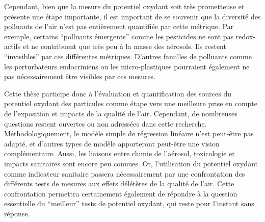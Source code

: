 Cependant, bien que la mesure du potentiel oxydant soit très prometteuse et présente une
étape importante, il est important de se souvenir que la diversité des polluants de l'air
n'est pas entièrement quantifiée par cette métrique.  Par exemple, certains ``polluants
émergents'' comme les pesticides ne sont pas redox-actifs et ne contribuent que très peu à
la masse des aérosols. Ils restent ``invisibles'' par ces différentes métriques. D'autres
familles de polluants comme les perturbateurs endocriniens ou les micro-plastiques pourraient
également ne pas nécessairement être visibles par ces mesures.

Cette thèse participe donc à l'évaluation et quantification des sources
du potentiel oxydant des particules comme étape vers une meilleure prise en compte de
l'exposition et impacts de la qualité de l'air. Cependant, de nombreuses questions restent
ouvertes ou non adressées dans cette recherche. Méthodologiquement, le modèle simple de
régression linéaire n'est peut-être pas adapté, et d'autres types de modèle apporteront
peut-être une vision complémentaire. Aussi, les liaisons entre chimie de l'aérosol,
toxicologie et impacts sanitaires sont encore peu connues. Or, l'utilisation du potentiel
oxydant comme indicateur sanitaire passera nécessairement par une confrontation des
différents tests de mesures aux effets délétères de la qualité de l'air. Cette
confrontation permettra certainement également de répondre à la question essentielle du
``meilleur'' tests de potentiel oxydant, qui reste pour l'instant sans réponse.
